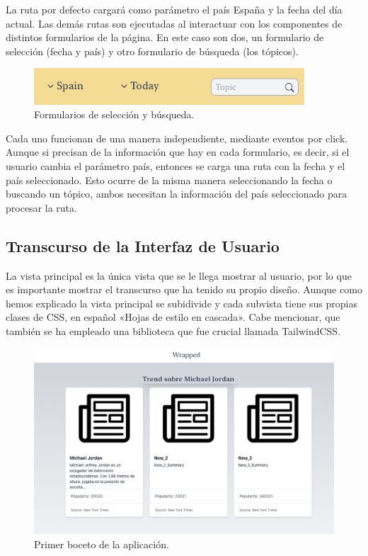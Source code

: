 La ruta por defecto cargará como parámetro el país España y la fecha del día actual. Las demás rutas son ejecutadas al interactuar con los componentes de distintos formularios de la página. En este caso son dos, un formulario de selección (fecha y país) y otro formulario de búsqueda (los tópicos).

\vspace{0.3cm}

\begin{figure}[H]
    \centering
    \myfloatalign
    \includegraphics[width=0.9\textwidth]{gfx/Formularios.png}
    \caption[Formularios de selección y búsqueda]{Formularios de selección y búsqueda.}\label{gfx:Formularios}
\end{figure}

Cada uno funcionan de una manera independiente, mediante eventos por click. Aunque si precisan de la información que hay en cada formulario, es decir, si el usuario cambia el parámetro país, entonces se carga una ruta con la fecha y el país seleccionado. Esto ocurre de la misma manera seleccionando la fecha o buscando un tópico, ambos necesitan la información del país seleccionado para procesar la ruta.

\subsection{Transcurso de la Interfaz de Usuario}
La vista principal es la única vista que se le llega mostrar al usuario, por lo que es importante mostrar el transcurso que ha tenido su propio diseño. Aunque como hemos explicado la vista principal se subidivide y cada subvista tiene sus propias clases de CSS, en español «Hojas de estilo en cascada». Cabe mencionar, que también se ha empleado una biblioteca que fue crucial llamada TailwindCSS.

\begin{figure}[H]
    \centering
    \myfloatalign
    \includegraphics[width=1\textwidth]{gfx/primer-boceto.png}
    \caption[Primer boceto de la aplicación]{Primer boceto de la aplicación.}\label{gfx:primer-boceto}
\end{figure}

